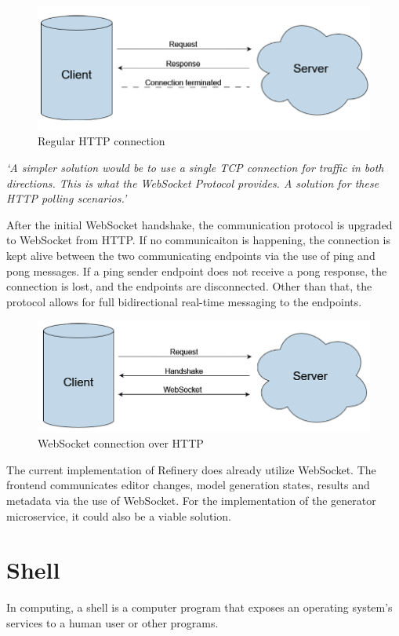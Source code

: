 	\begin{figure}[h!]
		\includegraphics{include/imgs/http.PNG}
		\caption{Regular HTTP connection}
	\end{figure}

	\textit{`A simpler solution would be to use a single TCP connection for
	traffic in both directions. This is what the WebSocket Protocol
	provides. A solution for these HTTP polling scenarios.'}

	After the initial WebSocket handshake, the communication protocol is upgraded to WebSocket from HTTP.
	If no communicaiton is happening, the connection is kept alive between the two communicating endpoints via the use of ping and pong messages.
	If a ping sender endpoint does not receive a pong response, the connection is lost, and the endpoints are disconnected.
	Other than that, the protocol allows for full bidirectional real-time messaging to the endpoints.

	\begin{figure}[h!]
		\includegraphics{include/imgs/websocket.PNG}
		\caption{WebSocket connection over HTTP}
	\end{figure}

	The current implementation of Refinery does already utilize WebSocket. The frontend communicates editor changes, model generation
	states, results and metadata via the use of WebSocket. 
	For the implementation of the generator microservice, it could also be a viable solution.

\section{Shell} \label{backgrshell}
	In computing, a shell \cite{shell} is a computer program that exposes an operating system's services to a human user or other programs. 

